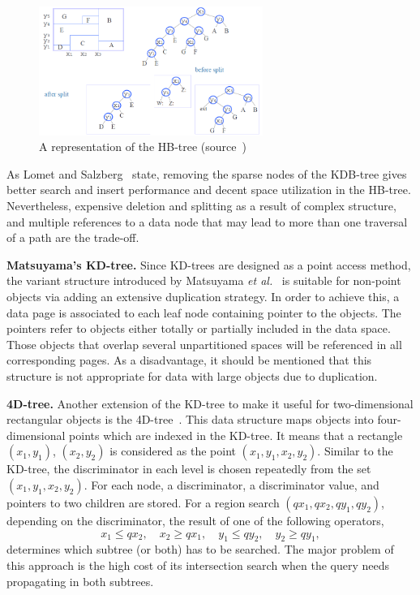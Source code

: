\documentclass[a4paper,12pt]{article}
\begin{document}
\begin{figure}
\centering
\includegraphics[width=0.65\textwidth,height=0.2\textheight]{hbtree}
\caption{A representation of the HB-tree (source~\cite{hbtree1})}
\label{fighbtree}
\end{figure}

As Lomet and Salzberg~\cite{hbtree1} state, removing the sparse nodes of the KDB-tree gives better search and insert performance and decent space utilization in the HB-tree. Nevertheless, expensive deletion and splitting as a result of complex structure, and multiple references to a data node that may lead to more than one traversal of a path are the trade-off.

\textbf{Matsuyama's KD-tree.} Since KD-trees are designed as a point access method, the variant structure introduced by Matsuyama \emph{et al.}~\cite{matsuyama} is suitable for non-point objects via adding an extensive duplication strategy. In order to achieve this, a data page is associated to each leaf node containing pointer to the objects. The pointers refer to objects either totally or partially included in the data space. Those objects that overlap several unpartitioned spaces will be referenced in all corresponding pages. As a disadvantage, it should be mentioned that this structure is not appropriate for data with large objects due to duplication.

\textbf{4D-tree.} Another extension of the KD-tree to make it useful for two-dimensional rectangular objects is the 4D-tree~\cite{4dtree}. This data structure maps objects into four-dimensional points which are indexed in the KD-tree. It means that a rectangle $(x‍‍_1, y_1)$, $(x_2, y_2)$ is considered as the point $(x‍‍_1, y_1, x_2, y_2)$. Similar to the KD-tree, the discriminator in each level is chosen repeatedly from the set $(x‍‍_1, y_1, x_2, y_2)$. For each node, a discriminator, a discriminator value, and pointers to two children are stored. 
For a region search $(qx_1, qx_2, qy_1, qy_2)$, depending on the discriminator, the result of one of the following operators,
$$x_1 \leq qx_2, \quad x_2 \geq qx_1, \quad y_1 \leq qy_2, \quad y_2 \geq qy_1,$$ 
determines which subtree (or both) has to be searched.
The major problem of this approach is the high cost of its intersection search when the query needs propagating in both subtrees. 
\end{document}
